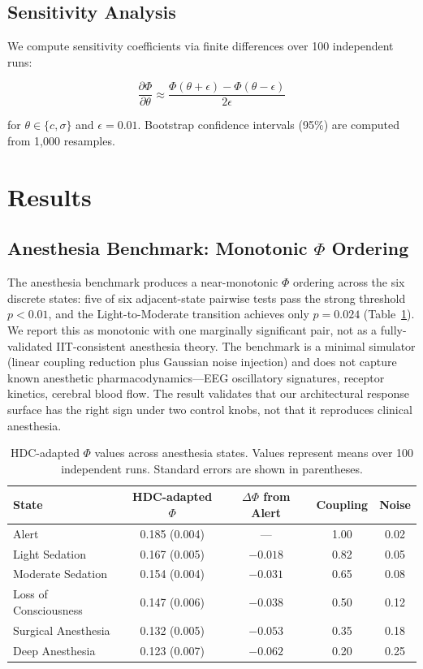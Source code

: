 \documentclass[12pt,a4paper]{article}
\begin{document}
\subsection{Sensitivity Analysis}

We compute sensitivity coefficients via finite differences over 100 independent runs:

\begin{equation}
\frac{\partial \Phi}{\partial \theta} \approx \frac{\Phi(\theta + \epsilon) - \Phi(\theta - \epsilon)}{2\epsilon}
\end{equation}

for $\theta \in \{c, \sigma\}$ and $\epsilon = 0.01$. Bootstrap confidence intervals (95\%) are computed from 1,000 resamples.

\section{Results}

\subsection{Anesthesia Benchmark: Monotonic $\Phi$ Ordering}

The anesthesia benchmark produces a near-monotonic $\Phi$ ordering across the six discrete states: five of six adjacent-state pairwise tests pass the strong threshold $p < 0.01$, and the Light-to-Moderate transition achieves only $p = 0.024$ (Table~\ref{tab:phi-ordering}). We report this as monotonic with one marginally significant pair, not as a fully-validated IIT-consistent anesthesia theory. The benchmark is a minimal simulator (linear coupling reduction plus Gaussian noise injection) and does not capture known anesthetic pharmacodynamics---EEG oscillatory signatures, receptor kinetics, cerebral blood flow. The result validates that our architectural response surface has the right sign under two control knobs, not that it reproduces clinical anesthesia.

\begin{table}[H]
\centering
\caption{HDC-adapted $\Phi$ values across anesthesia states. Values represent means over 100 independent runs. Standard errors are shown in parentheses.}
\label{tab:phi-ordering}
\begin{tabular}{lcccc}
\toprule
\textbf{State} & \textbf{HDC-adapted $\Phi$} & \textbf{$\Delta\Phi$ from Alert} & \textbf{Coupling} & \textbf{Noise} \\
\midrule
Alert & 0.185 (0.004) & --- & 1.00 & 0.02 \\
Light Sedation & 0.167 (0.005) & $-0.018$ & 0.82 & 0.05 \\
Moderate Sedation & 0.154 (0.004) & $-0.031$ & 0.65 & 0.08 \\
Loss of Consciousness & 0.147 (0.006) & $-0.038$ & 0.50 & 0.12 \\
Surgical Anesthesia & 0.132 (0.005) & $-0.053$ & 0.35 & 0.18 \\
Deep Anesthesia & 0.123 (0.007) & $-0.062$ & 0.20 & 0.25 \\
\bottomrule
\end{tabular}
\end{table}
\end{document}
